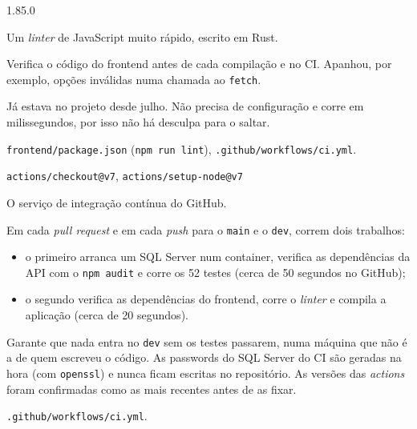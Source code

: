 \documentclass[a4paper,12pt]{article}
\newenvironment{ficha}[2]{%
  \par\needspace{7\baselineskip}\medskip\noindent{\large\bfseries #1}\hfill{\small\color{gray!70!black}#2}\par\nopagebreak\smallskip
  \begin{description}[leftmargin=3.1cm,labelwidth=2.8cm,labelsep=0.3cm,font=\normalfont\bfseries\small,itemsep=2pt,topsep=2pt,before=\raggedright]
}{\end{description}\medskip}
\begin{document}
\begin{ficha}{oxlint}{1.85.0}
  \item[O que é] Um \textit{linter} de JavaScript muito rápido, escrito em Rust.
  \item[Para que serviu] Verifica o código do frontend antes de cada compilação e no CI. Apanhou, por exemplo, opções inválidas numa chamada ao \texttt{fetch}.
  \item[Porquê] Já estava no projeto desde julho. Não precisa de configuração e corre em milissegundos, por isso não há desculpa para o saltar.
  \item[Onde está] \texttt{frontend/package.json} (\texttt{npm run lint}), \texttt{.github/workflows/ci.yml}.
\end{ficha}

\begin{ficha}{GitHub Actions}{\texttt{actions/checkout@v7}, \texttt{actions/setup-node@v7}}
  \item[O que é] O serviço de integração contínua do GitHub.
  \item[Para que serviu] Em cada \textit{pull request} e em cada \textit{push} para o \texttt{main} e o \texttt{dev}, correm dois trabalhos:
  \begin{itemize}
    \item o primeiro arranca um SQL Server num container, verifica as dependências da API com o \texttt{npm audit} e corre os 52 testes (cerca de 50 segundos no GitHub);
    \item o segundo verifica as dependências do frontend, corre o \textit{linter} e compila a aplicação (cerca de 20 segundos).
  \end{itemize}
  \item[Porquê] Garante que nada entra no \texttt{dev} sem os testes passarem, numa máquina que não é a de quem escreveu o código. As passwords do SQL Server do CI são geradas na hora (com \texttt{openssl}) e nunca ficam escritas no repositório. As versões das \textit{actions} foram confirmadas como as mais recentes antes de as fixar.
  \item[Onde está] \texttt{.github/workflows/ci.yml}.
\end{ficha}
\end{document}
